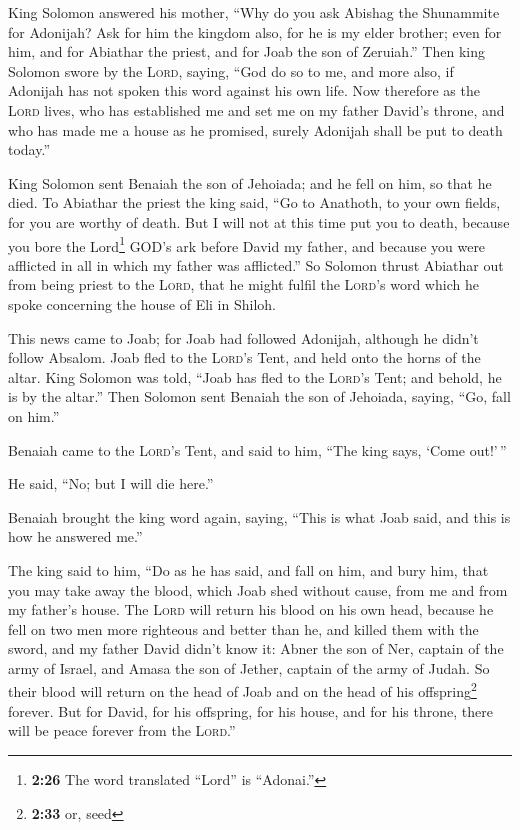  King Solomon answered his mother, ``Why do you ask
Abishag the Shunammite for Adonijah? Ask for him the kingdom also, for
he is my elder brother; even for him, and for Abiathar the priest, and
for Joab the son of Zeruiah.''  Then king Solomon swore
by the \textsc{Lord}, saying, ``God do so to me, and more also, if
Adonijah has not spoken this word against his own life. 
Now therefore as the \textsc{Lord} lives, who has established me and set
me on my father David's throne, and who has made me a house as he
promised, surely Adonijah shall be put to death today.''

 King Solomon sent Benaiah the son of Jehoiada; and he
fell on him, so that he died.  To Abiathar the priest the
king said, ``Go to Anathoth, to your own fields, for you are worthy of
death. But I will not at this time put you to death, because you bore
the Lord\footnote{\textbf{2:26} The word translated ``Lord'' is
  ``Adonai.''} GOD's ark before David my father, and because you were
afflicted in all in which my father was afflicted.''  So
Solomon thrust Abiathar out from being priest to the \textsc{Lord}, that
he might fulfil the \textsc{Lord}'s word which he spoke concerning the
house of Eli in Shiloh.

 This news came to Joab; for Joab had followed Adonijah,
although he didn't follow Absalom. Joab fled to the \textsc{Lord}'s
Tent, and held onto the horns of the altar.  King Solomon
was told, ``Joab has fled to the \textsc{Lord}'s Tent; and behold, he is
by the altar.'' Then Solomon sent Benaiah the son of Jehoiada, saying,
``Go, fall on him.''

 Benaiah came to the \textsc{Lord}'s Tent, and said to
him, ``The king says, `Come out!'\,''

He said, ``No; but I will die here.''

Benaiah brought the king word again, saying, ``This is what Joab said,
and this is how he answered me.''

 The king said to him, ``Do as he has said, and fall on
him, and bury him, that you may take away the blood, which Joab shed
without cause, from me and from my father's house.  The
\textsc{Lord} will return his blood on his own head, because he fell on
two men more righteous and better than he, and killed them with the
sword, and my father David didn't know it: Abner the son of Ner, captain
of the army of Israel, and Amasa the son of Jether, captain of the army
of Judah.  So their blood will return on the head of Joab
and on the head of his offspring\footnote{\textbf{2:33} or, seed}
forever. But for David, for his offspring, for his house, and for his
throne, there will be peace forever from the \textsc{Lord}.''

